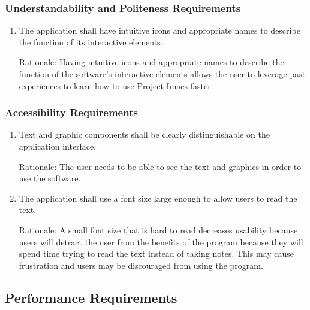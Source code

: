 \documentclass{article}
\begin{document}
\subsubsection{Understandability and Politeness Requirements}
\begin{enumerate}[UPR1]
    \item The application shall have intuitive icons and appropriate names to describe the function of its interactive elements.

	Rationale: Having intuitive icons and appropriate names to describe the function of the software's interactive elements allows the user to leverage past experiences to learn how to use Project Imacs faster.
\end{enumerate}

\subsubsection{Accessibility Requirements}
\begin{enumerate}[{A}CR1]
    \item Text and graphic components shall be clearly distinguishable on the application interface.

	Rationale: The user needs to be able to see the text and graphics in order to use the software.
    \item The application shall use a font size large enough to allow users to read the text.

	Rationale: A small font size that is hard to read decreases usability because users will detract the user from the benefits of the program because they will spend time trying to read the text instead of taking notes. This may cause frustration and users may be discouraged from using the program.
\end{enumerate}

\subsection{Performance Requirements}
\end{document}

